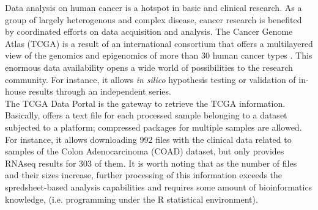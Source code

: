 \documentclass{bmcart}
\begin{document}
Data analysis on human cancer is a hotspot in basic and clinical research. As a group of largely heterogenous and complex disease, cancer research is benefited by coordinated efforts on data acquisition and analysis. The Cancer Genome Atlas (TCGA) is a result of an international consortium that offers a multilayered view of the genomics and epigenomics of more than 30 human cancer types \cite{weinstein2013cancer}. This enormous data availability opens a wide world of possibilities to the research community. For instance, it allows \textit{in silico} hypothesis testing or validation of in-house results through an independent series.\\




The TCGA Data Portal is the gateway to retrieve the TCGA information. Basically, offers a text file for each processed sample belonging to a dataset subjected to a platform; compressed packages for multiple samples are allowed. For instance, it allows downloading 992 files with the clinical data related to samples of the Colon Adenocarcinoma (COAD) dataset, but only provides RNAseq results for 303 of them. It is worth noting that as the number of files and their sizes increase, further processing of this information exceeds the spredsheet-based analysis capabilities and requires some amount of bioinformatics knowledge, (i.e. programming under the R statistical environment).\\ %
\end{document}

